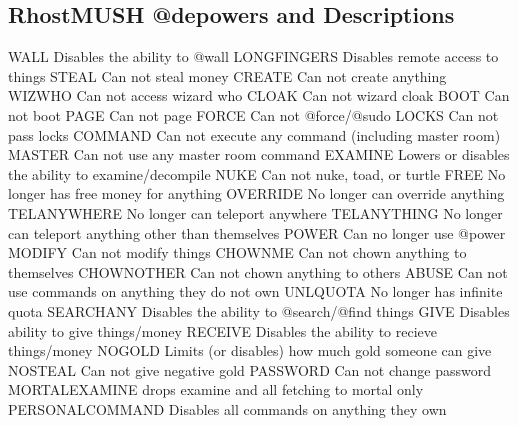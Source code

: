 \documentclass[letterpaper,10pt,english]{sphinxmanual}
\begin{document}
\subsection{RhostMUSH @depowers and Descriptions}
\label{\detokenize{security:rhostmush-depowers-and-descriptions}}
\begin{sphinxVerbatim}[commandchars=\\\{\}]
WALL               \PYGZhy{} Disables the ability to @wall
LONG\PYGZus{}FINGERS       \PYGZhy{} Disables remote access to things
STEAL              \PYGZhy{} Can not steal money
CREATE             \PYGZhy{} Can not create anything
WIZ\PYGZus{}WHO            \PYGZhy{} Can not access wizard who
CLOAK              \PYGZhy{} Can not wizard cloak
BOOT               \PYGZhy{} Can not boot
PAGE               \PYGZhy{} Can not page
FORCE              \PYGZhy{} Can not @force/@sudo
LOCKS              \PYGZhy{} Can not pass locks
COMMAND            \PYGZhy{} Can not execute any \PYGZdl{}command (including master room)
MASTER             \PYGZhy{} Can not use any master room \PYGZdl{}command
EXAMINE            \PYGZhy{} Lowers or disables the ability to examine/decompile
NUKE               \PYGZhy{} Can not nuke, toad, or turtle
FREE               \PYGZhy{} No longer has free money for anything
OVERRIDE           \PYGZhy{} No longer can override anything
TEL\PYGZus{}ANYWHERE       \PYGZhy{} No longer can teleport anywhere
TEL\PYGZus{}ANYTHING       \PYGZhy{} No longer can teleport anything other than themselves
POWER              \PYGZhy{} Can no longer use @power
MODIFY             \PYGZhy{} Can not modify things
CHOWN\PYGZus{}ME           \PYGZhy{} Can not chown anything to themselves
CHOWN\PYGZus{}OTHER        \PYGZhy{} Can not chown anything to others
ABUSE              \PYGZhy{} Can not use \PYGZdl{}commands on anything they do not own
UNL\PYGZus{}QUOTA          \PYGZhy{} No longer has infinite quota
SEARCH\PYGZus{}ANY         \PYGZhy{} Disables the ability to @search/@find things
GIVE               \PYGZhy{} Disables ability to give things/money
RECEIVE            \PYGZhy{} Disables the ability to recieve things/money
NOGOLD             \PYGZhy{} Limits (or disables) how much gold someone can give
NOSTEAL            \PYGZhy{} Can not give negative gold
PASSWORD           \PYGZhy{} Can not change password
MORTAL\PYGZus{}EXAMINE     \PYGZhy{} drops examine and all fetching to mortal only
PERSONAL\PYGZus{}COMMAND   \PYGZhy{} Disables all \PYGZdl{}commands on anything they own
\end{sphinxVerbatim}
\end{document}
